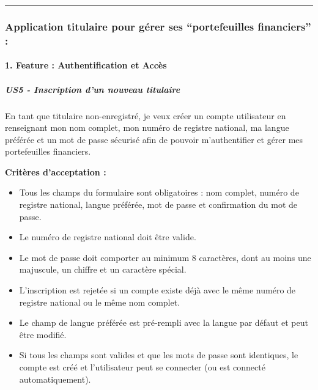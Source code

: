 \begin{center}\rule{0.5\linewidth}{0.5pt}\end{center}

\hypertarget{application-titulaire-pour-guxe9rer-ses-portefeuilles-financiers}{%
\subsubsection{Application titulaire pour gérer ses ``portefeuilles
financiers''
:}\label{application-titulaire-pour-guxe9rer-ses-portefeuilles-financiers}}

\hypertarget{feature-authentification-et-accuxe8s}{%
\paragraph{1. Feature : Authentification et
Accès}\label{feature-authentification-et-accuxe8s}}

\hypertarget{us5---inscription-dun-nouveau-titulaire}{%
\subparagraph{US5 - Inscription d'un nouveau
titulaire}\label{us5---inscription-dun-nouveau-titulaire}}

En tant que titulaire non-enregistré, je veux créer un compte
utilisateur en renseignant mon nom complet, mon numéro de registre
national, ma langue préférée et un mot de passe sécurisé afin de pouvoir
m'authentifier et gérer mes portefeuilles financiers.

\textbf{Critères d'acceptation :}

\begin{itemize}
\tightlist
\item
  Tous les champs du formulaire sont obligatoires : nom complet, numéro
  de registre national, langue préférée, mot de passe et confirmation du
  mot de passe.
\item
  Le numéro de registre national doit être valide.
\item
  Le mot de passe doit comporter au minimum 8 caractères, dont au moins
  une majuscule, un chiffre et un caractère spécial.
\item
  L'inscription est rejetée si un compte existe déjà avec le même numéro
  de registre national ou le même nom complet.
\item
  Le champ de langue préférée est pré-rempli avec la langue par défaut
  et peut être modifié.
\item
  Si tous les champs sont valides et que les mots de passe sont
  identiques, le compte est créé et l'utilisateur peut se connecter (ou
  est connecté automatiquement).
\end{itemize}

